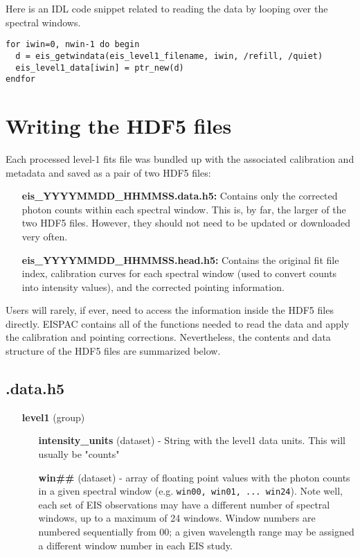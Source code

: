 Here is an IDL code snippet related to reading the data by looping over the spectral windows.
\begin{lstlisting}[language=idl]
for iwin=0, nwin-1 do begin
  d = eis_getwindata(eis_level1_filename, iwin, /refill, /quiet)
  eis_level1_data[iwin] = ptr_new(d)
endfor
\end{lstlisting}

\section{Writing the HDF5 files}
Each processed level-1 fits file was bundled up with the associated calibration and metadata and saved
as a pair of two HDF5 files:

\begin{enumerate}
\item[\bf eis\_YYYYMMDD\_HHMMSS.data.h5:] Contains only the corrected photon counts within each
  spectral window. This is, by far, the larger of the two HDF5 files. However, they should not need to
  be updated or downloaded very often.
\item[\bf eis\_YYYYMMDD\_HHMMSS.head.h5:] Contains the original fit file index, calibration curves for
  each spectral window (used to convert counts into intensity values), and the corrected pointing
  information.
\end{enumerate}

Users will rarely, if ever, need to access the information inside the HDF5 files directly. EISPAC
contains all of the functions needed to read the data and apply the calibration and pointing
corrections. Nevertheless, the contents and data structure of the HDF5 files are summarized below.

\subsection{.data.h5}
\begin{itemize}
  \item [\bf level1] (group)
  \begin{itemize}
    \item [\bf {intensity\_units}] (dataset) - String with the level1 data units. This will usually be
    "counts"
    \item [\bf {win\#\#}] (dataset) - array of floating point values with the photon counts in a given
    spectral window (e.g. \texttt{win00, win01, ... win24}). Note well, each set of EIS observations may have
    a different number of spectral windows, up to a maximum of 24 windows. Window numbers are
    numbered sequentially from 00; a given wavelength range may be assigned a different window number
    in each EIS study.
  \end{itemize}
\end{itemize}

